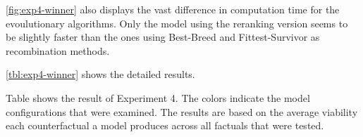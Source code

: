 \documentclass[./../../paper.tex]{subfiles}
\begin{document}
\autoref{fig:exp4-winner} also displays the vast difference in computation time for the evoulutionary algorithms. Only the model using the  reranking version seems to be slightly faster than the ones using Best-Breed and Fittest-Survivor as recombination methods.

\autoref{tbl:exp4-winner} shows the detailed results.

\begin{table}
    \caption{Table shows the result of Experiment 4. The colors indicate the model configurations that were examined. The results are based on the average viability each counterfactual a model produces across all factuals that were tested.}
    \label{tbl:exp4-winner}
\makebox[\linewidth]{


}
\end{table}
\end{document}
